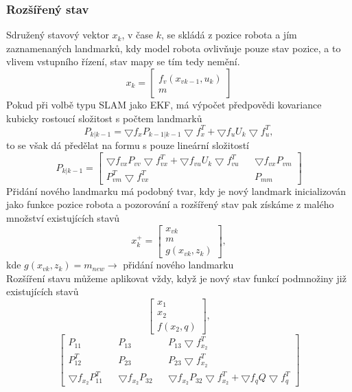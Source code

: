 \documentclass[11pt]{article}
\begin{document}
\subsubsection{Rozšířený stav}
Sdružený stavový vektor $x_k$, v čase $k$, se skládá z pozice robota a jím zaznamenaných landmarků, kdy model robota ovlivňuje pouze stav pozice, a to vlivem vstupního řízení, stav mapy se tím tedy nemění. 
$$x_k=\begin{bmatrix}
f_v(x_{vk-1},u_k)\\m
\end{bmatrix} $$
Pokud při volbě typu SLAM jako EKF, má výpočet předpovědi kovariance kubicky rostoucí složitost s počtem landmarků
$$P_{k|k-1}=\bigtriangledown f_xP_{k-1|k-1}\bigtriangledown f^T_x+\bigtriangledown f_uU_k\bigtriangledown f^T_u,$$
to se však dá předělat na formu s pouze lineární složitostí
$$P_{k|k-1}=\begin{bmatrix}
\bigtriangledown f_{vx}P_{vv}\bigtriangledown f^T_{vx}+\bigtriangledown f_{vu}U_k\bigtriangledown f^T_{vu}&&\bigtriangledown f_{vx}P_{vm}\\
P^T_{vm}\bigtriangledown f^T_{vx}&&P_{mm}
\end{bmatrix} $$
Přidání nového landmarku má podobný tvar, kdy je nový landmark inicializován jako funkce pozice robota a pozorování a rozšířený stav pak získáme z malého množství existujících stavů 
$$x^+_k=\begin{bmatrix}
x_{vk}\\m\\g(x_{vk},z_k)
\end{bmatrix},$$
kde $g(x_{vk},z_k)=m_{new}\rightarrow$ přidání nového landmarku \\
Rozšíření stavu můžeme aplikovat vždy, když je nový stav funkcí podmnožiny již existujících stavů
$$\begin{bmatrix}
x_1\\x_2\\f(x_2,q)
\end{bmatrix}, $$
$$
\begin{bmatrix}
P_{11}&&P_{13}&&P_{13}\bigtriangledown f^T_{x_2}\\
P^T_{12}&&P_{23}&&P_{23}\bigtriangledown f^T_{x_2}\\
\bigtriangledown f_{x_2}P^T_{11}&&\bigtriangledown f_{x_2}P_{32}&&\bigtriangledown f_{x_2}P_{32}\bigtriangledown f^T_{x_2}+\bigtriangledown f_qQ\bigtriangledown f^T_q
\end{bmatrix}
$$
\end{document}
